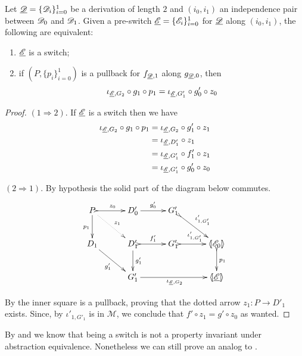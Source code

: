 \begin{lemma}\label{lem:equi}
Let $\underline{\mathscr{D}}=\{\mathscr{D}_{i}\}_{i=0}^1$ be a derivation of length $2$ and $(i_0, i_1)$ an independence pair between $\mathscr{D}_0$ and $\mathscr{D}_1$. Given a pre-switch $\underline{\mathscr{E}}=\{\mathscr{E}_{i}\}_{i=0}^1$ for $\underline{\mathscr{D}}$ along $(i_0, i_1)$, the following are equivalent:
	\begin{enumerate}
		\item $\underline{\mathscr{E}}$ is a switch;
		\item if $(P, \{p_i\}_{i=0}^1)$ is a pullback for $f_{\underline{\mathscr{D}},1}$ along $g_{\underline{\mathscr{D}},0}$, then \[\iota_{\underline{\mathscr{E}}, G_2} \circ g_1\circ p_1=\iota_{\underline{\mathscr{E}}, G'_1}\circ g'_0\circ z_0\]
	\end{enumerate}
\end{lemma}
\begin{proof}$(1 \Rightarrow 2)$. If $\underline{\mathscr{E}}$ is a switch then we have
	\begin{align*}
		\iota_{\underline{\mathscr{E}}, G_2} \circ g_1\circ p_1&=\iota_{\underline{\mathscr{E}}, G_2} \circ g'_1\circ z_1\\&=\iota_{\underline{\mathscr{E}}, D'_1}\circ z_1\\&=\iota_{\underline{\mathscr{E}}, G'_1}\circ f'_1\circ z_1\\&=\iota_{\underline{\mathscr{E}}, G'_1}\circ g'_0\circ z_0
	\end{align*}
	
	\smallskip \noindent $(2\Rightarrow 1)$. By hypothesis the solid part of the diagram below commutes.
	\[\xymatrix@C=30pt{P \ar@{>->}[r]^{z_0} \ar@{.>}[dr]^{z_1}\ar[d]_{p_1} & D'_0 \ar[r]^{g'_0} & G'_1 \ar@{>->}[dr]^{\iota'_{1, G'_1}}\\ D_1 \ar[dr]_{g'_1}& D'_1 \ar[d]^{g'_1}\ar@{>->}[r]^{f'_1} &G'_1 \ar@{>->}[r]^{\iota'_{1, G'_1}} &\lpro \dder{E}_0 \rpro 	\ar@{>->}[d]^{p_1} \\ & G'_1 	\ar[rr]_{\iota_{\der{E}, G_2}}&& \tpro{E} }\]
	
	By  the inner square is a pullback, proving that the dotted arrow $z_1\colon P\to D'_1$ exists.  Since, by  $\iota'_{1, G'_1}$ is in $\mathcal{M}$, we conclude that $f'\circ z_1=g'\circ z_0$ as wanted.
\end{proof}

By  and  we know that being a switch is not a property invariant under  abstraction equivalence. Nonetheless we  can still prove an analog to .

